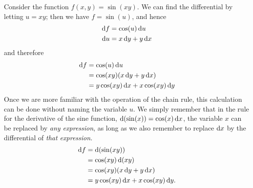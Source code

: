 \documentclass[12pt]{amsart}
\begin{document}
\begin{eg}
  Consider the function $f(x,y) = \sin (xy)$.
  We can find the differential by letting $u=xy$; then we have $f = \sin(u)$, and hence
  \begin{align*}
    {\ensuremath{\mathrm{d} f}} &= \cos(u)\,{\mathrm{d} u}\\
    {\mathrm{d} u} &= x\,{\mathrm{d} y} + y\,{\mathrm{d} x}
  \end{align*}
  and therefore
  \begin{align*}
    {\ensuremath{\mathrm{d} f}} &= \cos(u)\,{\mathrm{d} u} \\
    &= \cos(xy) (x\,{\mathrm{d} y} + y\,{\mathrm{d} x})\\
    &= y\cos(xy)\,{\mathrm{d} x} + x\cos(xy)\,{\mathrm{d} y}
  \end{align*}
  Once we are more familiar with the operation of the chain rule, this calculation can be done without naming the variable $u$.
  We simply remember that in the rule for the derivative of the sine function, $\mathrm{d}(\sin(x)) = \cos(x) \, {\mathrm{d} x}$, the variable $x$ can be replaced by \emph{any expression}, as long as we also remember to replace ${\mathrm{d} x}$ by the differential of \emph{that expression}.
  \begin{align*}
    {\ensuremath{\mathrm{d} f}} &= \mathrm{d}(\sin(xy))\\
    &= \cos(xy) \, \mathrm{d}(xy)\\
    &= \cos(xy) (x\,{\mathrm{d} y} + y\,{\mathrm{d} x})\\
    &= y\cos(xy)\,{\mathrm{d} x} + x\cos(xy)\,{\mathrm{d} y}.
  \end{align*}
\end{eg}
\end{document}
